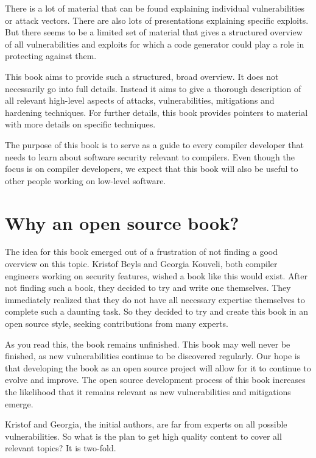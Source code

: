 \documentclass[a4paper,]{report}
\begin{document}
There is a lot of material that can be found explaining individual
vulnerabilities or attack vectors. There are also lots of presentations
explaining specific exploits. But there seems to be a limited set of
material that gives a structured overview of all vulnerabilities and
exploits for which a code generator could play a role in protecting
against them.

This book aims to provide such a structured, broad overview. It does not
necessarily go into full details. Instead it aims to give a thorough
description of all relevant high-level aspects of attacks,
vulnerabilities, mitigations and hardening techniques. For further
details, this book provides pointers to material with more details on
specific techniques.

The purpose of this book is to serve as a guide to every compiler
developer that needs to learn about software security relevant to
compilers. Even though the focus is on compiler developers, we expect
that this book will also be useful to other people working on low-level
software.

\hypertarget{why-an-open-source-book}{%
\section{Why an open source book?}\label{why-an-open-source-book}}

The idea for this book emerged out of a frustration of not finding a
good overview on this topic. Kristof Beyls and Georgia Kouveli, both
compiler engineers working on security features, wished a book like this
would exist. After not finding such a book, they decided to try and
write one themselves. They immediately realized that they do not have
all necessary expertise themselves to complete such a daunting task. So
they decided to try and create this book in an open source style,
seeking contributions from many experts.

As you read this, the book remains unfinished. This book may well never
be finished, as new vulnerabilities continue to be discovered regularly.
Our hope is that developing the book as an open source project will
allow for it to continue to evolve and improve. The open source
development process of this book increases the likelihood that it
remains relevant as new vulnerabilities and mitigations emerge.

Kristof and Georgia, the initial authors, are far from experts on all
possible vulnerabilities. So what is the plan to get high quality
content to cover all relevant topics? It is two-fold.
\end{document}
